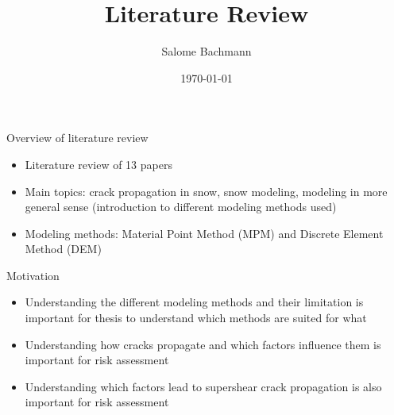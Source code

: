 \documentclass[11pt,aspectratio=169]{beamer}
\title{Literature Review}
\date[]{\today}
\author{Salome Bachmann}
\institute{}
\begin{document}

\titleframe





\begin{frame}{Overview of literature review}
    \begin{itemize}
        \item Literature review of 13 papers
        \item Main topics: crack propagation in snow, snow modeling, modeling in more general sense (introduction to different modeling methods used)
        \item Modeling methods: Material Point Method (MPM) and Discrete Element Method (DEM)
    \end{itemize}
\end{frame}

\begin{frame}{Motivation}
    \begin{itemize}
        \item Understanding the different modeling methods and their limitation is important for thesis to understand which methods are suited for what
        \item Understanding how cracks propagate and which factors influence them is important for risk assessment
        \item Understanding which factors lead to supershear crack propagation is also important for risk assessment
    \end{itemize}
\end{frame}
\end{document}
